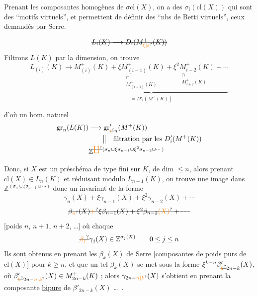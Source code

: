 Prenant les composantes homogènes de $\sigma\mathrm{cl}(X)$, on a des $\sigma_i(\mathrm{cl}(X))$ qui sont des ``motifs virtuels'', et permettent de définir des ``nbs de Betti virtuels'', ceux demandés par Serre.

\[
\deleted{L_i(K)\longrightarrow D_i(M^+_{\unsure{\xi|\varepsilon}}(K))}
\]
Filtrons $L(K)$ par la dimension, on trouve
\[
L_{(i)}(K)\longrightarrow
\underbrace{M^+_{(i)}(K)+\underset{\substack{\cap\\ M^+_{(i+1)}(K)}}{\xi M^+_{(i-1)}(K)}
+\underset{\substack{\cap\\ M^+_{i+2}(K)}}{\xi^2 M^+_{i-2}(K)}+\dotsb}_{=D'_i(M^+(K))}
\]
 

d'où un hom. naturel
\[
\begin{aligned}
\mathrm{gr}_n(L(K))&\longrightarrow\mathrm{gr}'_{\deleted{\unsure{i}}n}(M^+(K))\\
&\hspace{2em}\big\Vert\quad\text{filtration par les }D'_i(M^+(K))\\
&\mathbb Z^{\deleted{\unsure{\coprod}}(\sigma_n\cup\xi\sigma_{n-1}\cup\xi^2\sigma_{n-2}\cup\dotsb)}
\end{aligned}
\]

Donc, si $X$ est un préschéma de type fini  sur $K$, de dim $\leq n$, alors prenant $\mathrm{cl}(X)\in L_n(K)$ et réduisant modulo $L_{n-1}(K)$, on trouve une image dans $\mathbb Z^{(\sigma_n\cup\xi\sigma_{n-1}\cup\dotsb)}$ donc un invariant de la forme
\[
\gamma_n(X)+\xi\gamma_{n-1}(X)+\xi^2\gamma_{n-2}(X)+\dotsb
\]
\[
\deleted{\beta_{\unsure{n}}(X)\unsure{+}\xi\beta_{n-1}(X)+\xi^2\beta_{n-2}\unsure{(X)}+\dotsb}
\]
 [poids $n$, $n+1$, $n+2$, \dots]
où chaque
\[
\deleted{\unsure{\beta_{j}}}\gamma_{j}(X)\in\mathbb Z^{\sigma_j(X)}
\qquad 0\leq j\leq n
\]
Ils sont obtenus en prenant les $\beta_k(X)$ de Serre [composantes de poids purs de $\mathrm{cl}(X)$] pour $k\geq n$, et  que un tel $\beta_k(X)$ se met sous la forme $\xi^{k-n}\beta'_{\deleted{\unsure{k}}2n-k}(X)$, où $\beta'_{\deleted{\unsure{k}}2n-\unsure{n|k}}(X)\in M^+_{2n-k}(K)$ ; alors $\gamma_{2n-\unsure{n|k}}(X)$ s'obtient en prenant la composante \uline{bipure} de $\beta'_{2n-k}(X)$ \dots\ .

